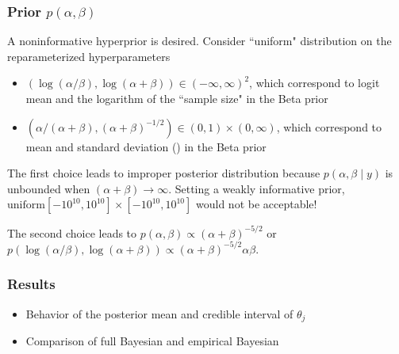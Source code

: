 \documentclass{beamer}
\begin{document}
\begin{frame}
  \frametitle{Prior $p(\alpha, \beta)$}
  A noninformative hyperprior is desired. Consider ``uniform" distribution on the reparameterized hyperparameters

  \begin{itemize}
  \item  $(\log(\alpha/\beta), \log(\alpha + \beta)) \in (-\infty, \infty)^2$, which correspond to logit mean and the logarithm of the ``sample size" in the Beta prior
  \item $(\alpha/(\alpha + \beta), (\alpha + \beta)^{-1/2}) \in (0,1) \times (0, \infty)$, which correspond to mean and standard deviation () in the Beta prior   
  \end{itemize}

  \vspace{0.2cm}
  The first choice leads to improper posterior distribution because $p(\alpha, \beta \mid y)$ is unbounded when $(\alpha + \beta) \rightarrow \infty$. Setting a weakly informative prior, $\mbox{uniform}[-10^{10}, 10^{10}] \times [-10^{10}, 10^{10}]$ would not be acceptable!

    \vspace{0.2cm}
  The second choice leads to $p(\alpha, \beta) \propto (\alpha + \beta)^{-5/2}$ or $p(\log(\alpha/\beta), \log(\alpha + \beta)) \propto (\alpha + \beta)^{-5/2} \alpha \beta$.
\end{frame}



\begin{frame}
  \frametitle{Results}
  \begin{itemize}
  \item  Behavior of the posterior mean and credible interval of $\theta_j$
    \item Comparison of full Bayesian and empirical Bayesian
\end{itemize}
\end{frame}



\end{document}
